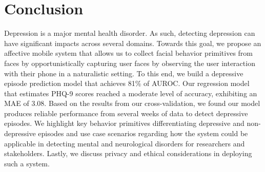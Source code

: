 \section{Conclusion}
Depression is a major mental health disorder. As such, detecting depression can have significant impacts across several domains. Towards this goal, we propose an affective mobile system that allows us to collect facial behavior primitives from faces by opportunistically capturing user faces by observing the user interaction with their phone in a naturalistic setting. To this end, we build a depressive episode prediction model that achieves 81\% of AUROC. Our regression model that estimates PHQ-9 scores reached a moderate level of accuracy, exhibiting an MAE of 3.08. Based on the results from our cross-validation, we found our model produces reliable performance from several weeks of data to detect depressive episodes. We highlight key behavior primitives differentiating depressive and non-depressive episodes and use case scenarios regarding how the system could be applicable in detecting mental and neurological disorders for researchers and stakeholders. Lastly, we discuss privacy and ethical considerations in deploying such a system.